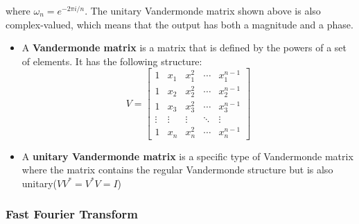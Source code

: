 \documentclass[11.5pt,a4paper]{article}
\begin{document}
\begin{itemize}
    where $\omega_n = e^{-2\pi i/n}$. The unitary Vandermonde matrix shown above is also complex-valued, which means that the output has both a magnitude and a phase.
    \begin{itemize}
        \item A \textbf{Vandermonde matrix} is a matrix that is defined by the powers of a set of elements. It has the following structure:
        \begin{equation*}
            V = 
            \begin{bmatrix}
                1 & x_1 & x_1^2 & \cdots & x_1^{n-1} \\
                1 & x_2 & x_2^2 & \cdots & x_2^{n-1} \\
                1 & x_3 & x_3^2 & \cdots & x_3^{n-1} \\
                \vdots & \vdots & \vdots & \ddots & \vdots \\
                1 & x_n & x_n^2 & \cdots & x_n^{n-1}
            \end{bmatrix}
        \end{equation*}
        \item A \textbf{unitary Vandermonde matrix} is a specific type of Vandermonde matrix where the matrix contains the regular Vandermonde structure but is also unitary($VV^* = V^*V = I$)
    \end{itemize}
\end{itemize}

\subsubsection*{Fast Fourier Transform}
\end{document}
